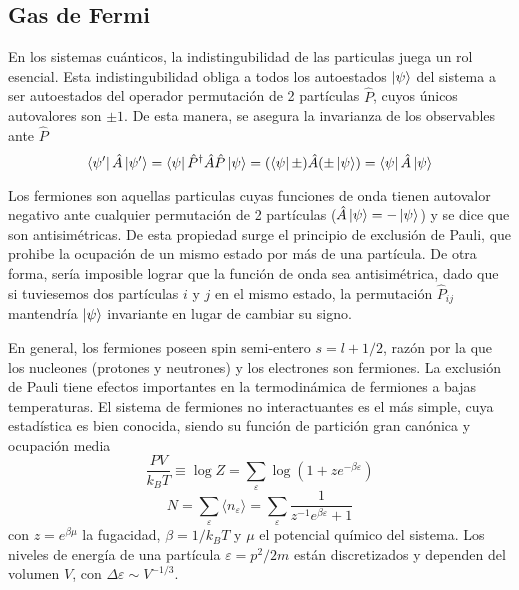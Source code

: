 \subsection{Gas de Fermi}{\label{sec:intro_fermi_gas}}

En los sistemas cuánticos, la indistingubilidad de las particulas juega un rol esencial.
Esta indistingubilidad obliga a todos los autoestados $\ket{\psi}$ del sistema a ser autoestados del operador permutación de 2 partículas $\hat{P}$, cuyos únicos autovalores son $\pm 1$.
De esta manera, se asegura la invarianza de los observables ante $\hat{P}$
\[\bra{\psi'}\hat{A}\ket{\psi'} = \bra{\psi}\hat{P}^\dagger\hat{A}\hat{P}\ket{\psi} = (\bra{\psi}\pm)\hat{A}(\pm\ket{\psi}) = \bra{\psi}\hat{A}\ket{\psi}\]

Los fermiones son aquellas particulas cuyas funciones de onda tienen autovalor negativo ante cualquier permutación de 2 partículas ($\hat{A}\ket{\psi} = -\ket{\psi}$) y se dice que son antisimétricas.
De esta propiedad surge el principio de exclusión de Pauli, que prohibe la ocupación de un mismo estado por más de una partícula.
De otra forma, sería imposible lograr que la función de onda sea antisimétrica, dado que si tuviesemos dos partículas $i$ y $j$ en el mismo estado, la permutación $\hat{P}_{ij}$ mantendría
$\ket{\psi}$ invariante en lugar de cambiar su signo.

En general, los fermiones poseen spin semi-entero $s=l+1/2$, razón por la que los nucleones (protones y neutrones) y los electrones son fermiones.
La exclusión de Pauli tiene efectos importantes en la termodinámica de fermiones a bajas temperaturas.
El sistema de fermiones no interactuantes es el más simple, cuya estadística es bien conocida, siendo su función de partición gran canónica y ocupación media
\begin{equation}
 \frac{PV}{k_BT} \equiv \log Z = \sum_\varepsilon \log(1+ze^{-\beta\varepsilon})
\end{equation}
\begin{equation}
 N = \sum_\varepsilon \langle n_\varepsilon\rangle = \sum_\varepsilon \frac{1}{z^{-1}e^{\beta\varepsilon}+1}
\end{equation}
con $z=e^{\beta\mu}$ la fugacidad, $\beta=1/k_BT$ y $\mu$ el potencial químico del sistema.
Los niveles de energía de una partícula $\varepsilon=p^2/2m$ están discretizados y dependen del volumen $V$, con $\Delta\varepsilon\sim V^{-1/3}$.


